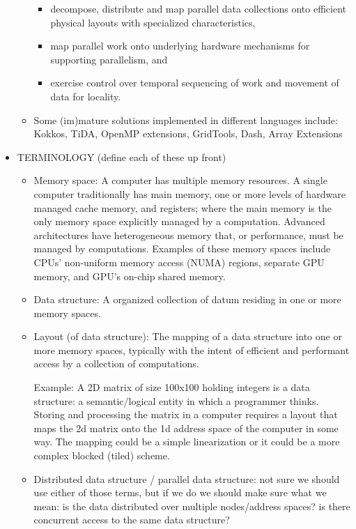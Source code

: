 \begin{itemize}
\begin{itemize}
    \begin{itemize}
    \item decompose, distribute and map parallel data collections onto efficient physical layouts with specialized characteristics, 
    \item map parallel work onto underlying hardware mechanisms for supporting parallelism, and 
    \item exercise control over temporal sequencing of work and movement of data for locality.
    \end{itemize}
  \item Some (im)mature solutions implemented in different languages include: Kokkos, TiDA, OpenMP extensions, GridTools, Dash, Array Extensions
\end{itemize}


\item TERMINOLOGY (define each of these up front)
  \begin{itemize}

  \item Memory space: A computer has multiple memory resources.  A single computer traditionally has main memory, one or more levels of hardware managed cache memory, and registers; where the main memory is the only memory space explicitly managed by a computation.  Advanced architectures have heterogeneous memory that, or performance, must be managed by computations.  Examples of these memory spaces include CPUs' non-uniform memory access (NUMA) regions, separate GPU memory, and GPU's on-chip shared memory.

  \item Data structure: A organized collection of datum residing in one or more memory spaces. 

  \item Layout (of data structure):
    The mapping of a data structure into one or more memory spaces, typically with the intent of efficient and performant access by a collection of computations.

    Example: A 2D matrix of size 100x100 holding integers is a data structure: a semantic/logical entity in which a programmer thinks. Storing and processing the matrix in a computer requires a layout that maps the 2d matrix onto the 1d address space of the computer in some way. The mapping could be a simple linearization or it could be a more complex blocked (tiled) scheme.

  \item Distributed data structure / parallel data structure: not sure we should use either of those terms, but if we do we should make sure what we mean: is the data distributed over multiple nodes/address spaces? is there concurrent access to the same data structure? 
    

\end{itemize}
\end{itemize}
